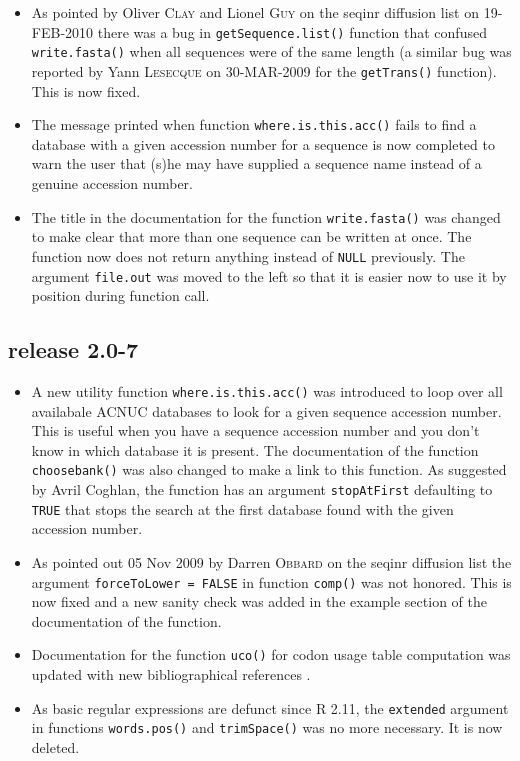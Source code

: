 \documentclass{article}
\begin{document}
\begin{itemize}

\item As pointed by Oliver \textsc{Clay} and Lionel \textsc{Guy} on the seqinr diffusion
list on 19-FEB-2010 there was a bug in \texttt{getSequence.list()}
function that confused \texttt{write.fasta()} when all sequences were
of the same length (a similar bug was reported by Yann \textsc{Lesecque}
on 30-MAR-2009 for the \texttt{getTrans()} function). This is now
fixed.

\item The message printed when function \texttt{where.is.this.acc()} fails
to find a database with a given accession number for a sequence is now
completed to warn the user that (s)he may have supplied a sequence name
instead of a genuine accession number.

\item The title in the documentation for the function \texttt{write.fasta()}
was changed to make clear that more than one sequence can be written at once.
The function now does not return anything instead of \texttt{NULL} previously.
The argument \texttt{file.out} was moved to the left so that it is easier now 
to use it by position during function call.

\end{itemize}

\subsection*{release 2.0-7}

\begin{itemize}

\item A new utility function \texttt{where.is.this.acc()} was introduced
to loop over all availabale ACNUC databases to look for
a given sequence accession number. This is useful when you have
a sequence accession number and you don't know in which database
it is present. The documentation of the function \texttt{choosebank()}
was also changed to make a link to this function. As suggested by 
Avril Coghlan, the function has an argument \texttt{stopAtFirst} defaulting
to \texttt{TRUE} that stops the search at the first database found
with the given accession number.

\item As pointed out 05 Nov 2009 by Darren \textsc{Obbard} on the seqinr diffusion list the argument \texttt{forceToLower = FALSE} in function \texttt{comp()} was not honored. This is now fixed and a new sanity check was added in the example section of the documentation of the function.

\item Documentation for the function \texttt{uco()} for codon usage table computation was updated with new bibliographical references \cite{lobrychessel, SuzukiH2008}.

\item As basic regular expressions are defunct since R 2.11, the
\texttt{extended} argument in functions \texttt{words.pos()} and
\texttt{trimSpace()} was no more necessary. It is now deleted. 

\end{itemize}
\end{document}
